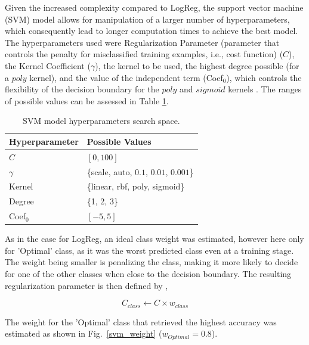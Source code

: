 \documentclass[conference]{IEEEtran}
\begin{document}
Given the increased complexity compared to LogReg, the support vector machine (SVM) model allows for manipulation of a larger number of hyperparameters, which consequently lead to longer computation times to achieve the best model. The hyperparameters used were Regularization Parameter (parameter that controls the penalty for misclassified training examples, i.e., cost function) ($C$), the Kernel Coefficient ($\gamma$), the kernel to be used, the highest degree possible (for a $poly$ kernel), and the value of the independent term (Coef$_0$), which controls the flexibility of the decision boundary for the $poly$ and $sigmoid$ kernels \cite{svm24}. The ranges of possible values can be assessed in Table \ref{parametrosSVM}.

\begin{table}[H]
\centering
\caption{SVM model hyperparameters search space.}
\label{parametrosSVM}
\begin{tabular}{ll}
\toprule
\textbf{Hyperparameter} & \textbf{Possible Values} \\
\midrule
$C$ & $[0, 100]$ \\ 
$\gamma$ & \{scale, auto, $0.1$, $0.01$, $0.001$\} \\ 
Kernel & \{linear, rbf, poly, sigmoid\} \\ 
Degree & \{1, 2, 3\} \\ 
Coef$_0$ & $[-5, 5]$ \\
\bottomrule
\end{tabular}
\end{table} %

As in the case for LogReg, an ideal class weight was estimated, however here only for 'Optimal' class, as it was the worst predicted class even at a training stage. The weight being smaller is penalizing the class, making it more likely to decide for one of the other classes when close to the decision boundary. The resulting regularization parameter is then defined by \cite{svm24},

$$C_{class} \leftarrow C \times w_{class}$$

The weight for the 'Optimal' class that retrieved the highest accuracy was estimated as shown in Fig.~\ref{svm_weight} ($w_{Optimal}=0.8$). 
\end{document}
